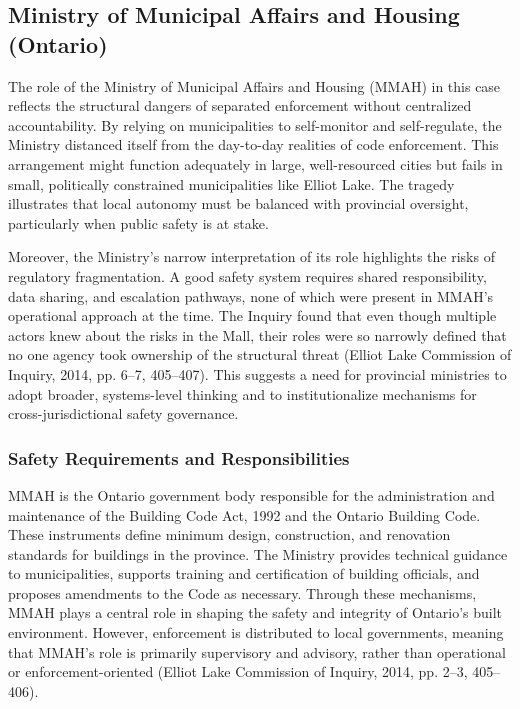 \documentclass[12pt]{article}
\begin{document}
\subsection{Ministry of Municipal Affairs and Housing (Ontario)}
The role of the Ministry of Municipal Affairs and Housing (MMAH) in this case reflects the structural dangers of separated enforcement without centralized accountability. By relying on municipalities to self-monitor and self-regulate, the Ministry distanced itself from the day-to-day realities of code enforcement. This arrangement might function adequately in large, well-resourced cities but fails in small, politically constrained municipalities like Elliot Lake. The tragedy illustrates that local autonomy must be balanced with provincial oversight, particularly when public safety is at stake.

Moreover, the Ministry’s narrow interpretation of its role highlights the risks of regulatory fragmentation. A good safety system requires shared responsibility, data sharing, and escalation pathways, none of which were present in MMAH’s operational approach at the time. The Inquiry found that even though multiple actors knew about the risks in the Mall, their roles were so narrowly defined that no one agency took ownership of the structural threat (Elliot Lake Commission of Inquiry, 2014, pp. 6–7, 405–407). This suggests a need for provincial ministries to adopt broader, systems-level thinking and to institutionalize mechanisms for cross-jurisdictional safety governance.

\subsubsection*{Safety Requirements and Responsibilities}
MMAH is the Ontario government body responsible for the administration and maintenance of the Building Code Act, 1992 and the Ontario Building Code. These instruments define minimum design, construction, and renovation standards for buildings in the province. The Ministry provides technical guidance to municipalities, supports training and certification of building officials, and proposes amendments to the Code as necessary. Through these mechanisms, MMAH plays a central role in shaping the safety and integrity of Ontario’s built environment. However, enforcement is distributed to local governments, meaning that MMAH’s role is primarily supervisory and advisory, rather than operational or enforcement-oriented (Elliot Lake Commission of Inquiry, 2014, pp. 2–3, 405–406).
\end{document}
